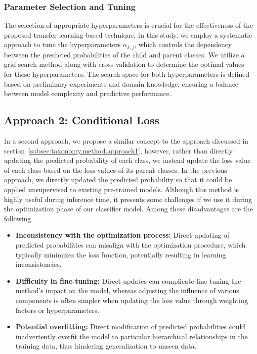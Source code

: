 \subsubsection{Parameter Selection and Tuning}
The selection of appropriate hyperparameters is crucial for the effectiveness of the proposed transfer learning-based technique. In this study, we employ a systematic approach to tune the hyperparameters $\alpha_{k,j} $, which controls the dependency between the predicted probabilities of the child and parent classes. We utilize a grid search method along with cross-validation to determine the optimal values for these hyperparameters. The search space for both hyperparameters is defined based on preliminary experiments and domain knowledge, ensuring a balance between model complexity and predictive performance.
\subsection{Approach 2: Conditional Loss}\label{subsec:taxonomy.method.approach2}
In a second approach, we propose a similar concept to the approach discussed in section~\ref{subsec:taxonomy.method.approach1}, however, rather than directly updating the predicted probability of each class, we instead update the loss value of each class based on the loss values of its parent classes. In the previous approach, we directly updated the predicted probability so that it could be applied unsupervised to existing pre-trained models. Although this method is highly useful during inference time, it presents some challenges if we use it during the optimization phase of our classifier model. Among these disadvantages are the following.
\begin{itemize}
    \item \textbf{Inconsistency with the optimization process:} Direct updating of predicted probabilities can misalign with the optimization procedure, which typically minimizes the loss function, potentially resulting in learning inconsistencies.
    \item \textbf{Difficulty in fine-tuning:} Direct updates can complicate fine-tuning the method's impact on the model, whereas adjusting the influence of various components is often simpler when updating the loss value through weighting factors or hyperparameters.
    \item \textbf{Potential overfitting:} Direct modification of predicted probabilities could inadvertently overfit the model to particular hierarchical relationships in the training data, thus hindering generalization to unseen data.
\end{itemize}
